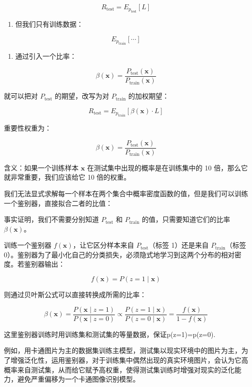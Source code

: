 \[
R_{\mathrm{test}}=E_{p_{\mathrm{test}}}[L]
\]

\begin{enumerate}
\def\labelenumi{\arabic{enumi}.}
\setcounter{enumi}{1}
\tightlist
\item
  但我们只有训练数据：
\end{enumerate}

\[
E_{p_{\mathrm{train}}}[\cdots]
\]

\begin{enumerate}
\def\labelenumi{\arabic{enumi}.}
\setcounter{enumi}{2}
\tightlist
\item
  通过引入一个比率：
\end{enumerate}

\[
\beta(\mathbf{x})=\frac{P_{\mathrm{test}}(\mathbf{x})}{P_{\mathrm{train}}(\mathbf{x})}
\]

就可以把对 \(P_{\mathrm{test}}\) 的期望，改写为对 \(P_{\mathrm{train}}\) 的加权期望：

\[
R_{\mathrm{test}}=E_{p_{\mathrm{train}}}[\beta(\mathbf{x})\cdot L]
\]

重要性权重为：

\[
\beta(\mathbf{x})=\frac{P_{\mathrm{test}}(\mathbf{x})}{P_{\mathrm{train}}(\mathbf{x})}
\]

含义：如果一个训练样本 \(\mathbf{x}\) 在测试集中出现的概率是在训练集中的 10 倍，那么它就非常重要，我们应该给它 10 倍的权重。

我们无法显式求解每一个样本在两个集合中概率密度函数的值，但是我们可以训练一个鉴别器，直接拟合二者的比值：

事实证明，我们不需要分别知道 \(P_{\mathrm{test}}\) 和 \(P_{\mathrm{train}}\) 的值，只需要知道它们的比率 \(\beta(\mathbf{x})\)。

训练一个鉴别器 \(f(\mathbf{x})\)，让它区分样本来自 \(P_{\mathrm{test}}\)（标签 1）还是来自 \(P_{\mathrm{train}}\)（标签 0）。鉴别器为了最小化自己的分类损失，必须隐式地学习到这两个分布的相对密度。若鉴别器输出：

\[
f(\mathbf{x})=P(z=1\mid\mathbf{x})
\]

则通过贝叶斯公式可以直接转换成所需的比率：

\[
\beta(\mathbf{x})
=\frac{P(\mathbf{x}\mid z=1)}{P(\mathbf{x}\mid z=0)}
\propto\frac{P(z=1\mid\mathbf{x})}{P(z=0\mid\mathbf{x})}
=\frac{f(\mathbf{x})}{1-f(\mathbf{x})}
\]

这里鉴别器训练时用训练集和测试集的等量数据，保证p(z=1)=p(z=0).

例如，用卡通图片为主的数据集训练主模型，测试集以现实环境中的图片为主，为了增强泛化性，运用鉴别器，对于训练集中偶然出现的真实环境图片，会认为它高概率来自测试集，从而给它赋予高权重，使得测试集训练时增强对现实的泛化能力，避免严重偏移为一个卡通图像识别模型。

